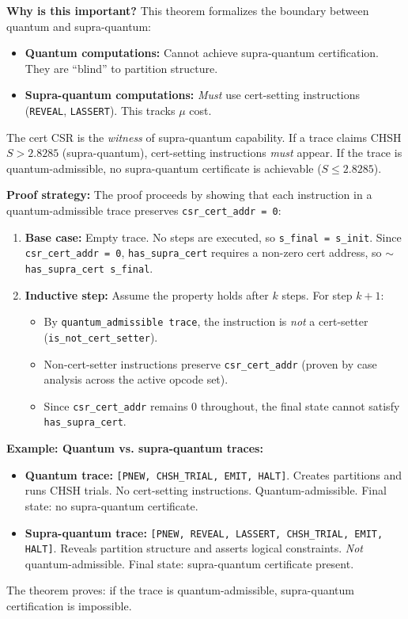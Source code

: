 \textbf{Why is this important?} This theorem formalizes the boundary between quantum and supra-quantum:
\begin{itemize}
    \item \textbf{Quantum computations:} Cannot achieve supra-quantum certification. They are ``blind'' to partition structure.
    \item \textbf{Supra-quantum computations:} \textit{Must} use cert-setting instructions (\texttt{REVEAL}, \texttt{LASSERT}). This tracks $\mu$ cost.
\end{itemize}
The cert CSR is the \textit{witness} of supra-quantum capability. If a trace claims CHSH $S > 2.8285$ (supra-quantum), cert-setting instructions \textit{must} appear. If the trace is quantum-admissible, no supra-quantum certificate is achievable ($S \leq 2.8285$).

\textbf{Proof strategy:} The proof proceeds by showing that each instruction in a quantum-admissible trace preserves \texttt{csr\_cert\_addr = 0}:
\begin{enumerate}
    \item \textbf{Base case:} Empty trace. No steps are executed, so \texttt{s\_final = s\_init}. Since \texttt{csr\_cert\_addr = 0}, \texttt{has\_supra\_cert} requires a non-zero cert address, so $\sim$\texttt{has\_supra\_cert s\_final}.

    \item \textbf{Inductive step:} Assume the property holds after $k$ steps. For step $k+1$:
    \begin{itemize}
        \item By \texttt{quantum\_admissible trace}, the instruction is \textit{not} a cert-setter (\texttt{is\_not\_cert\_setter}).
        \item Non-cert-setter instructions preserve \texttt{csr\_cert\_addr} (proven by case analysis across the active opcode set).
        \item Since \texttt{csr\_cert\_addr} remains 0 throughout, the final state cannot satisfy \texttt{has\_supra\_cert}.
    \end{itemize}
\end{enumerate}

\textbf{Example: Quantum vs. supra-quantum traces:}
\begin{itemize}
    \item \textbf{Quantum trace:} \texttt{[PNEW, CHSH\_TRIAL, EMIT, HALT]}. Creates partitions and runs CHSH trials. No cert-setting instructions. Quantum-admissible. Final state: no supra-quantum certificate.

    \item \textbf{Supra-quantum trace:} \texttt{[PNEW, REVEAL, LASSERT, CHSH\_TRIAL, EMIT, HALT]}. Reveals partition structure and asserts logical constraints. \textit{Not} quantum-admissible. Final state: supra-quantum certificate present.
\end{itemize}
The theorem proves: if the trace is quantum-admissible, supra-quantum certification is impossible.

